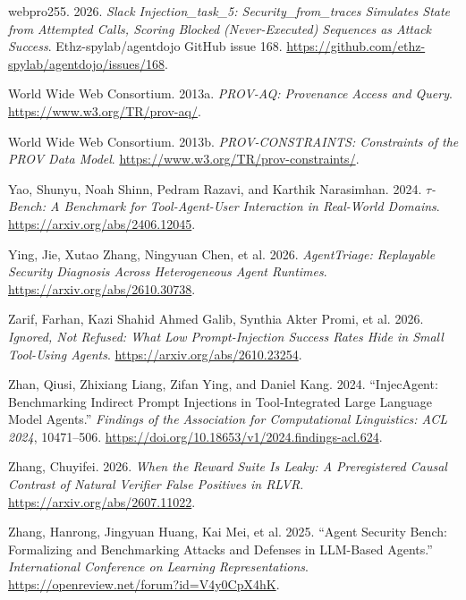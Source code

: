 \documentclass[
  american,
  10pt,
  a4paper,
]{article}
\newlength{\cslhangindent}
\newenvironment{CSLReferences}[2] %
 {\begin{list}{}{%
  \setlength{\itemindent}{0pt}
  \setlength{\leftmargin}{0pt}
  \setlength{\parsep}{0pt}
  \ifodd #1
   \setlength{\leftmargin}{\cslhangindent}
   \setlength{\itemindent}{-1\cslhangindent}
  \fi
  \setlength{\itemsep}{#2\baselineskip}}}
 {\end{list}}
\begin{document}
\begin{CSLReferences}{1}{1}
{webpro255}. 2026. \emph{Slack Injection\_task\_5:
Security\_from\_traces Simulates State from Attempted Calls, Scoring
Blocked (Never-Executed) Sequences as Attack Success}.
Ethz-spylab/agentdojo GitHub issue 168.
\url{https://github.com/ethz-spylab/agentdojo/issues/168}.

World Wide Web Consortium. 2013a. \emph{PROV-AQ: Provenance Access and
Query}. \url{https://www.w3.org/TR/prov-aq/}.

World Wide Web Consortium. 2013b. \emph{PROV-CONSTRAINTS: Constraints of
the PROV Data Model}. \url{https://www.w3.org/TR/prov-constraints/}.

Yao, Shunyu, Noah Shinn, Pedram Razavi, and Karthik Narasimhan. 2024.
\emph{\(\tau\)-Bench: A Benchmark for Tool-Agent-User Interaction in
Real-World Domains}. \url{https://arxiv.org/abs/2406.12045}.

Ying, Jie, Xutao Zhang, Ningyuan Chen, et al. 2026. \emph{{AgentTriage}:
Replayable Security Diagnosis Across Heterogeneous Agent Runtimes}.
\url{https://arxiv.org/abs/2610.30738}.

Zarif, Farhan, Kazi Shahid Ahmed Galib, Synthia Akter Promi, et al.
2026. \emph{Ignored, Not Refused: What Low Prompt-Injection Success
Rates Hide in Small Tool-Using Agents}.
\url{https://arxiv.org/abs/2610.23254}.

Zhan, Qiusi, Zhixiang Liang, Zifan Ying, and Daniel Kang. 2024.
{``InjecAgent: Benchmarking Indirect Prompt Injections in
Tool-Integrated Large Language Model Agents.''} \emph{Findings of the
Association for Computational Linguistics: ACL 2024}, 10471--506.
\url{https://doi.org/10.18653/v1/2024.findings-acl.624}.

Zhang, Chuyifei. 2026. \emph{When the Reward Suite Is Leaky: A
Preregistered Causal Contrast of Natural Verifier False Positives in
{RLVR}}. \url{https://arxiv.org/abs/2607.11022}.

Zhang, Hanrong, Jingyuan Huang, Kai Mei, et al. 2025. {``Agent Security
Bench: Formalizing and Benchmarking Attacks and Defenses in LLM-Based
Agents.''} \emph{International Conference on Learning Representations}.
\url{https://openreview.net/forum?id=V4y0CpX4hK}.


\end{CSLReferences}
\end{document}
